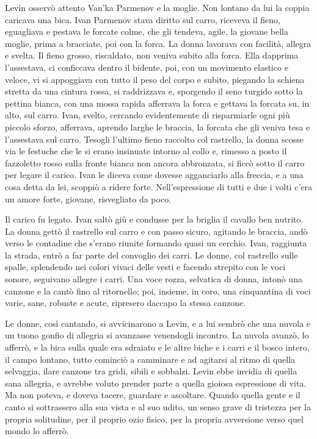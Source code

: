 Levin osservò attento Van'ka Parmenov e la moglie. Non lontano da lui la coppia caricava una bica. Ivan Parmenov stava diritto sul carro, riceveva il fieno, eguagliava e pestava le forcate colme, che gli tendeva, agile, la giovane bella moglie, prima a bracciate, poi con la forca. La donna lavorava con facilità, allegra e svelta. Il fieno grosso, riscaldato, non veniva subito alla forca. Ella dapprima l'assestava, ci conficcava dentro il bidente, poi, con un movimento elastico e veloce, vi si appoggiava con tutto il peso del corpo e subito, piegando la schiena stretta da una cintura rossa, si raddrizzava e, sporgendo il seno turgido sotto la pettina bianca, con una mossa rapida afferrava la forca e gettava la forcata su, in alto, sul carro. Ivan, svelto, cercando evidentemente di risparmiarle ogni più piccolo sforzo, afferrava, aprendo larghe le braccia, la forcata che gli veniva tesa e l'assestava sul carro. Tesogli l'ultimo fieno raccolto col rastrello, la donna scosse via le festuche che le si erano insinuate intorno al collo e, rimesso a posto il fazzoletto rosso sulla fronte bianca non ancora abbronzata, si ficcò sotto il carro per legare il carico. Ivan le diceva come dovesse agganciarlo alla freccia, e a una cosa detta da lei, scoppiò a ridere forte. Nell'espressione di tutti e due i volti c'era un amore forte, giovane, risvegliato da poco. 
\enlargethispage*{1\baselineskip}

Il carico fu legato. Ivan saltò giù e condusse per la briglia il cavallo ben nutrito. La donna gettò il rastrello sul carro e con passo sicuro, agitando le braccia, andò verso le contadine che s'erano riunite formando quasi un cerchio. Ivan, raggiunta la strada, entrò a far parte del convoglio dei carri. Le donne, col rastrello sulle spalle, splendendo nei colori vivaci delle vesti e facendo strepito con le voci sonore, seguivano allegre i carri. Una voce rozza, selvatica di donna, intonò una canzone e la cantò fino al ritornello; poi, insieme, in coro, una cinquantina di voci varie, sane, robuste e acute, ripresero daccapo la stessa canzone. 

Le donne, così cantando, si avvicinarono a Levin, e a lui sembrò che una nuvola e un tuono gonfio di allegria si avanzasse venendogli incontro. La nuvola avanzò, lo afferrò, e la bica sulla quale era sdraiato e le altre biche e i carri e il bosco intero, il campo lontano, tutto cominciò a camminare e ad agitarsi al ritmo di quella selvaggia, ilare canzone tra gridi, sibili e sobbalzi. Levin ebbe invidia di quella sana allegria, e avrebbe voluto prender parte a quella gioiosa espressione di vita. Ma non poteva, e doveva tacere, guardare e ascoltare. Quando quella gente e il canto si sottrassero alla sua vista e al suo udito, un senso grave di tristezza per la propria solitudine, per il proprio ozio fisico, per la propria avversione verso quel mondo lo afferrò. 

